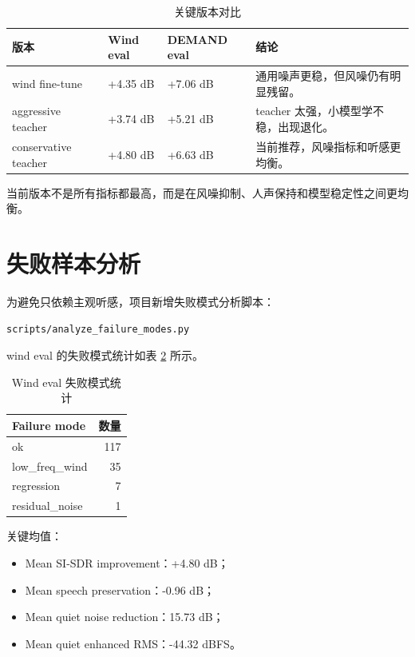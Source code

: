 \documentclass[UTF8,12pt,a4paper]{ctexart}
\begin{document}
\begin{table}[H]
\centering
\caption{关键版本对比}
\label{tab:version_compare}
\begin{tabularx}{\textwidth}{p{4.0cm}p{2.2cm}p{2.2cm}X}
\toprule
\textbf{版本} & \textbf{Wind eval} & \textbf{DEMAND eval} & \textbf{结论} \\
\midrule
wind fine-tune & +4.35 dB & +7.06 dB & 通用噪声更稳，但风噪仍有明显残留。 \\
aggressive teacher & +3.74 dB & +5.21 dB & teacher 太强，小模型学不稳，出现退化。 \\
conservative teacher & +4.80 dB & +6.63 dB & 当前推荐，风噪指标和听感更均衡。 \\
\bottomrule
\end{tabularx}
\end{table}

当前版本不是所有指标都最高，而是在风噪抑制、人声保持和模型稳定性之间更均衡。

\section{失败样本分析}

为避免只依赖主观听感，项目新增失败模式分析脚本：

\begin{lstlisting}
scripts/analyze_failure_modes.py
\end{lstlisting}

wind eval 的失败模式统计如表 \ref{tab:failure} 所示。

\begin{table}[H]
\centering
\caption{Wind eval 失败模式统计}
\label{tab:failure}
\begin{tabular}{lr}
\toprule
\textbf{Failure mode} & \textbf{数量} \\
\midrule
ok & 117 \\
low\_freq\_wind & 35 \\
regression & 7 \\
residual\_noise & 1 \\
\bottomrule
\end{tabular}
\end{table}

关键均值：

\begin{itemize}
  \item Mean SI-SDR improvement：+4.80 dB；
  \item Mean speech preservation：-0.96 dB；
  \item Mean quiet noise reduction：15.73 dB；
  \item Mean quiet enhanced RMS：-44.32 dBFS。
\end{itemize}
\end{document}
